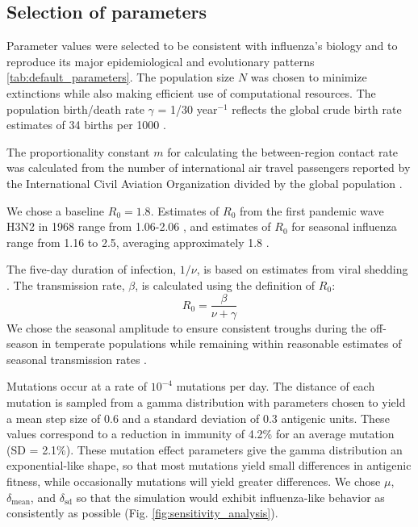 \documentclass[10pt]{article}
\begin{document}
\subsection{Selection of parameters}
Parameter values were selected to be consistent with influenza's biology and to reproduce its major epidemiological and evolutionary patterns \ref{tab:default_parameters}.
The population size $N$ was chosen to minimize extinctions while also making efficient use of computational resources.
The population birth/death rate $\gamma$ = 1/30 year$^{-1}$ reflects the global crude birth rate estimates of 34 births per 1000 \cite{UN:2013}.

The proportionality constant $m$ for calculating the between-region contact rate was calculated from the number of international air travel passengers reported by the International Civil Aviation Organization divided by the global population \cite{ICAO:2014}.

We chose a baseline $R_0 = 1.8$. 
Estimates of $R_0$ from the first pandemic wave H3N2 in 1968 range from 1.06-2.06 \cite{Jackson:2010hi}, and estimates of $R_0$ for seasonal influenza range from 1.16 to 2.5, averaging approximately 1.8 \cite{Biggerstaff:2014bu}. 

The five-day duration of infection, $1/\nu$, is based on estimates from viral shedding \cite{Carrat:2008bk}. 
The transmission rate, $\beta$, is calculated using the definition of $R_0$:
\begin{equation*}
R_0 = \frac{\beta}{\nu + \gamma}
\end{equation*}
We chose the seasonal amplitude to ensure consistent troughs during the off-season in temperate populations while remaining within reasonable estimates of seasonal transmission rates \cite{Truscott:2012fh}.

Mutations occur at a rate of $10^{-4}$ mutations per day.
The distance of each mutation is sampled from a gamma distribution with parameters chosen to yield a mean step size of 0.6 and a standard deviation of 0.3 antigenic units. 
These values correspond to a reduction in immunity of 4.2\% for an average mutation (SD = 2.1\%).
These mutation effect parameters give the gamma distribution an exponential-like shape, so that most mutations yield small differences in antigenic fitness, while occasionally mutations will yield greater differences. 
We chose $\mu$, $\delta_\text{mean}$, and $\delta_\text{sd}$ so that the simulation would exhibit influenza-like behavior as consistently as possible (Fig. \ref{fig:sensitivity_analysis}).
\end{document}
